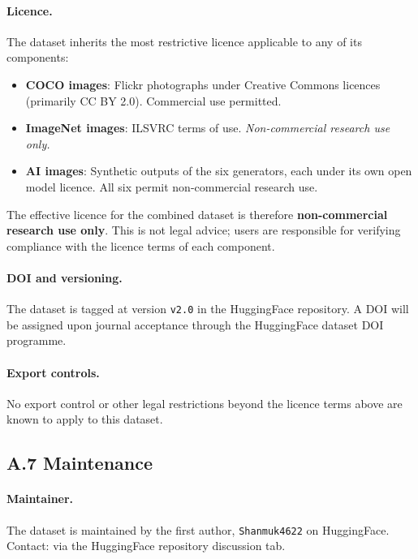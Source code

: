 \paragraph{Licence.}
The dataset inherits the most restrictive licence applicable to any
of its components:
\begin{itemize}[leftmargin=1.5em, itemsep=2pt]
  \item \textbf{COCO images}: Flickr photographs under Creative Commons
    licences (primarily CC BY 2.0). Commercial use permitted.
  \item \textbf{ImageNet images}: ILSVRC terms of use.
    \emph{Non-commercial research use only.}
  \item \textbf{AI images}: Synthetic outputs of the six generators,
    each under its own open model licence. All six permit
    non-commercial research use.
\end{itemize}
The effective licence for the combined dataset is therefore
\textbf{non-commercial research use only}.
This is not legal advice; users are responsible for verifying
compliance with the licence terms of each component.

\paragraph{DOI and versioning.}
The dataset is tagged at version \texttt{v2.0} in the HuggingFace
repository.
A DOI will be assigned upon journal acceptance through the
HuggingFace dataset DOI programme.

\paragraph{Export controls.}
No export control or other legal restrictions beyond the licence
terms above are known to apply to this dataset.

\subsection*{A.7 \quad Maintenance}
\label{ssec:ds_maintenance}

\paragraph{Maintainer.}
The dataset is maintained by the first author,
\texttt{Shanmuk4622} on HuggingFace.
Contact: via the HuggingFace repository discussion tab.

